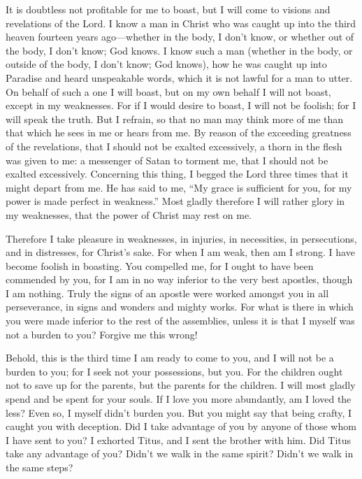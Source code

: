  It is doubtless not profitable for me to boast, but I will
come to visions and revelations of the Lord.  I know a man
in Christ who was caught up into the third heaven fourteen years
ago---whether in the body, I don't know, or whether out of the body, I
don't know; God knows.  I know such a man (whether in the
body, or outside of the body, I don't know; God knows),  how
he was caught up into Paradise and heard unspeakable words, which it is
not lawful for a man to utter.  On behalf of such a one I
will boast, but on my own behalf I will not boast, except in my
weaknesses.  For if I would desire to boast, I will not be
foolish; for I will speak the truth. But I refrain, so that no man may
think more of me than that which he sees in me or hears from me.
 By reason of the exceeding greatness of the revelations,
that I should not be exalted excessively, a thorn in the flesh was given
to me: a messenger of Satan to torment me, that I should not be exalted
excessively.  Concerning this thing, I begged the Lord three
times that it might depart from me.  He has said to me, ``My
grace is sufficient for you, for my power is made perfect in weakness.''
Most gladly therefore I will rather glory in my weaknesses, that the
power of Christ may rest on me.

 Therefore I take pleasure in weaknesses, in injuries, in
necessities, in persecutions, and in distresses, for Christ's sake. For
when I am weak, then am I strong.  I have become foolish in
boasting. You compelled me, for I ought to have been commended by you,
for I am in no way inferior to the very best apostles, though I am
nothing.  Truly the signs of an apostle were worked amongst
you in all perseverance, in signs and wonders and mighty works.
 For what is there in which you were made inferior to the
rest of the assemblies, unless it is that I myself was not a burden to
you? Forgive me this wrong!

 Behold, this is the third time I am ready to come to you,
and I will not be a burden to you; for I seek not your possessions, but
you. For the children ought not to save up for the parents, but the
parents for the children.  I will most gladly spend and be
spent for your souls. If I love you more abundantly, am I loved the
less?  Even so, I myself didn't burden you. But you might
say that being crafty, I caught you with deception.  Did I
take advantage of you by anyone of those whom I have sent to you?
 I exhorted Titus, and I sent the brother with him. Did
Titus take any advantage of you? Didn't we walk in the same spirit?
Didn't we walk in the same steps?

